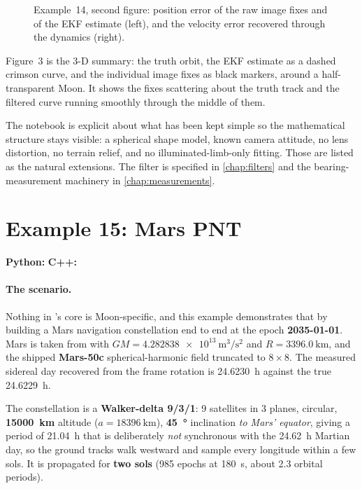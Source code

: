 \begin{figure}[htbp]
  \centering
  \caption{Example~14, second figure: position error of the raw image fixes and
           of the EKF estimate (left), and the velocity error recovered through
           the dynamics (right).}
  \label{fig:tut-ex14-err}
\end{figure}

Figure~3 is the 3-D summary: the truth orbit, the EKF estimate as a dashed
crimson curve, and the individual image fixes as black markers, around a
half-transparent Moon. It shows the fixes scattering about the truth track and
the filtered curve running smoothly through the middle of them.

The notebook is explicit about what has been kept simple so the mathematical
structure stays visible: a spherical shape model, known camera attitude, no lens
distortion, no terrain relief, and no illuminated-limb-only fitting. Those are
listed as the natural extensions. The filter is specified in
\cref{chap:filters} and the bearing-measurement machinery in
\cref{chap:measurements}.

\section{Example 15: Mars PNT}
\label{sec:tut-ex15}

\textbf{Python:}  \quad
\textbf{C++:} 

\paragraph{The scenario.}
Nothing in \lupnt{}'s core is Moon-specific, and this example demonstrates that
by building a Mars navigation constellation end to end at the epoch
\textbf{2035-01-01}. Mars is taken from  with
$GM=\SI{4.282838e13}{\meter\cubed\per\second\squared}$ and
$R=\SI{3396.0}{\kilo\meter}$, and the shipped \textbf{Mars-50c} spherical-harmonic
field truncated to \textbf{$8\times8$}. The measured sidereal day recovered from
the frame rotation is \SI{24.6230}{\hour} against the true \SI{24.6229}{\hour}.

The constellation is a \textbf{Walker-delta 9/3/1}: 9 satellites in 3 planes,
circular, \textbf{\SI{15000}{\kilo\meter}} altitude ($a=\SI{18396}{\kilo\meter}$),
\textbf{\SI{45}{\degree}} inclination \emph{to Mars' equator}, giving a period of
\SI{21.04}{\hour} that is deliberately \emph{not} synchronous with the
\SI{24.62}{\hour} Martian day, so the ground tracks walk westward and sample
every longitude within a few sols. It is propagated for \textbf{two sols} (985
epochs at \SI{180}{\second}, about 2.3 orbital periods).

